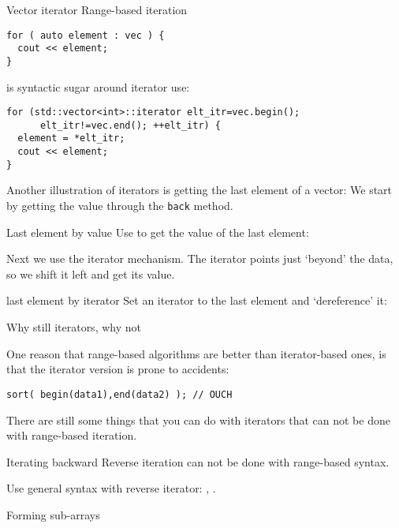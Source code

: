 \begin{slide}{Vector iterator}
  \label{sl:iterate-vector}
  Range-based iteration
\begin{lstlisting}
for ( auto element : vec ) {
  cout << element;
}
\end{lstlisting}
 is syntactic sugar around iterator use:
\begin{lstlisting}
for (std::vector<int>::iterator elt_itr=vec.begin();
      elt_itr!=vec.end(); ++elt_itr) {
  element = *elt_itr;
  cout << element;
}
\end{lstlisting}
\end{slide}

Another illustration of iterators is getting the
last element of a vector:
We start by getting the value through the \lstinline{back} method.

\begin{block}{Last element by value}
  Use  to get the value of the last element:
\end{block}

Next we use the iterator mechanism.
The  iterator points just `beyond' the data,
so we shift it left and get its value.

\begin{block}{last element by iterator}
  Set an iterator to the last element and `dereference' it:
\end{block}

 {Why still iterators, why not}

One reason that range-based algorithms are better than
iterator-based ones, is that the iterator version is prone to accidents:
\begin{lstlisting}
sort( begin(data1),end(data2) ); // OUCH
\end{lstlisting}

There are still some things that you can do with iterators that
can not be done with range-based iteration.

\begin{block}{Iterating backward}
  \label{sl:reverse-iterator}
  Reverse iteration can not be done with range-based syntax.
  
  Use general syntax with reverse iterator: ,
  .
\end{block}

 {Forming sub-arrays}

